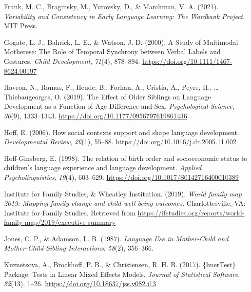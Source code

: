 \documentclass[
  english,
  man,floatsintext]{apa6}
\newlength{\cslhangindent}
\newlength{\cslentryspacingunit} %
\newenvironment{CSLReferences}[2] %
 {%
  \setlength{\parindent}{0pt}
  \ifodd #1
  \let\oldpar\par
  \def\par{\hangindent=\cslhangindent\oldpar}
  \fi
  \setlength{\parskip}{#2\cslentryspacingunit}
 }%
 {}
\begin{document}
\begin{CSLReferences}{1}{0}
\leavevmode{}%
Frank, M. C., Braginsky, M., Yurovsky, D., \& Marchman, V. A. (2021). \emph{Variability and {Consistency} in {Early} {Language} {Learning}: {The} {Wordbank} {Project}}. MIT Press.

\leavevmode{}%
Gogate, L. J., Bahrick, L. E., \& Watson, J. D. (2000). A {Study} of {Multimodal} {Motherese}: {The} {Role} of {Temporal} {Synchrony} between {Verbal} {Labels} and {Gestures}. \emph{Child Development}, \emph{71}(4), 878--894. \url{https://doi.org/10.1111/1467-8624.00197}

\leavevmode{}%
Havron, N., Ramus, F., Heude, B., Forhan, A., Cristia, A., Peyre, H., \ldots{} Thiebaugeorges, O. (2019). The {Effect} of {Older} {Siblings} on {Language} {Development} as a {Function} of {Age} {Difference} and {Sex}. \emph{Psychological Science}, \emph{30}(9), 1333--1343. \url{https://doi.org/10.1177/0956797619861436}

\leavevmode{}%
Hoff, E. (2006). How social contexts support and shape language development. \emph{Developmental Review}, \emph{26}(1), 55--88. \url{https://doi.org/10.1016/j.dr.2005.11.002}

\leavevmode{}%
Hoff-Ginsberg, E. (1998). The relation of birth order and socioeconomic status to children's language experience and language development. \emph{Applied Psycholinguistics}, \emph{19}(4), 603--629. \url{https://doi.org/10.1017/S0142716400010389}

\leavevmode{}%
Institute for Family Studies, \& Wheatley Institution. (2019). \emph{World family map 2019: {Mapping} family change and child well-being outcomes}. Charlottesville, VA: Institute for Family Studies. Retrieved from \url{https://ifstudies.org/reports/world-family-map/2019/executive-summary}

\leavevmode{}%
Jones, C. P., \& Adamson, L. B. (1987). \emph{Language {Use} in {Mother}-{Child} and {Mother}-{Child}-{Sibling} {Interactions}}. \emph{58}(2), 356--366.

\leavevmode{}%
Kuznetsova, A., Brockhoff, P. B., \& Christensen, R. H. B. (2017). \{{lmerTest}\} {Package}: {Tests} in {Linear} {Mixed} {Effects} {Models}. \emph{Journal of Statistical Software}, \emph{82}(13), 1--26. \url{https://doi.org/10.18637/jss.v082.i13}


\end{CSLReferences}
\end{document}
